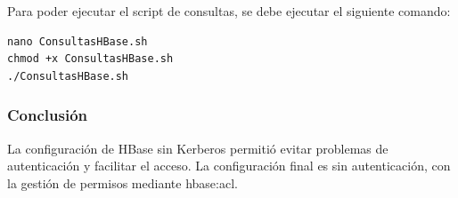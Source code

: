 \documentclass{article}
\begin{document}
Para poder ejecutar el script de consultas, se debe ejecutar el siguiente comando: 

\begin{lstlisting}[style=bashStyle]
nano ConsultasHBase.sh
chmod +x ConsultasHBase.sh
./ConsultasHBase.sh
\end{lstlisting}

\subsubsection{Conclusión}
La configuración de HBase sin Kerberos permitió evitar problemas de autenticación y facilitar el acceso. La configuración final es sin autenticación, con la gestión de permisos mediante hbase:acl.
\end{document}
